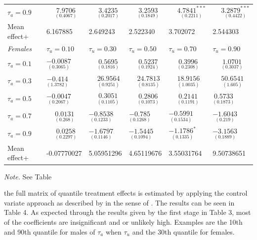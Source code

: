 \documentclass[12pt,a4paper]{article}
\begin{document}
\begin{table}[!htbp]
\begin{threeparttable}
\begin{tabular}{*{6}{l}}
           $\tau_a = 0.9$    & $\phantom{-}\underset{(0.4067)}{7.9706}$ & $\phantom{-}\underset{(0.2017)}{3.4235}$ & $\phantom{-}\underset{(0.1849)}{3.2593}$ & $\phantom{-}\underset{(0.2211)}{4.7841^{***}}$ & $\phantom{-}\underset{(0.4422)}{3.2879^{***}}$ 
\\ 
Mean effect+ &6.167885 & 2.649243 & 2.522340 &  3.702072 &  2.544303
\\ \toprule
        \textit{Females} &  \( \tau_u=0.10\) & \( \tau_u= 0.30\) & \( \tau_u= 0.50\) & \( \tau_u= 0.70\) & \( \tau_u= 0.90\) \\
        \midrule
        \addlinespace
        $\tau_a = 0.1$ & $\underset{(0.3065)}{-0.0087}$ & $\phantom{-}\underset{(0.1816)}{0.5695}$ & $\phantom{-}\underset{(0.1924)}{0.5237}$ & $\phantom{-}\underset{(0.2308)}{0.3996}$ & $\phantom{-}\underset{(0.3037)}{1.0701}$   \\
         $\tau_a = 0.3$   & $\underset{(1.3782)}{-0.414}$ & $\phantom{-}\underset{(0.9251)}{26.9564}$ & $\phantom{-}\underset{(0.8135)}{24.7813}$ & $\phantom{-}\underset{(1.0035)}{18.9156}$ & $\phantom{-}\underset{(1.605)}{50.6541}$ \\
          $\tau_a = 0.5$   & $\underset{(0.2067)}{-0.0047}$ & $\phantom{-}\underset{(0.1105)}{0.3051}$ & $\phantom{-}\underset{(0.1073)}{0.2806}$ & $\phantom{-}\underset{(0.1191)}{0.2141}$ & $\underset{(0.1873)}{0.5733}$   \\
           $\tau_a = 0.7$   &  $\phantom{-}\underset{(0.268)}{0.0131}$ & $\underset{(0.1233)}{-0.8538}$ & $\underset{(0.1268)}{-0.785}$ & $\underset{(0.1534)}{-0.5991}$ & $\underset{(0.219)}{-1.6043}$    \\
           $\tau_a = 0.9$    & $\phantom{-}\underset{(0.2297)}{0.0258}$ & $\underset{(0.1146)}{-1.6797}$ & $\underset{(0.1094)}{-1.5445}$ & $\underset{(0.1335)}{-1.1786^{*}}$ & $\underset{(0.1889)}{-3.1563}$    \\
           Mean effect+ & -0.07770027 &  5.05951296 & 4.65119676 &  3.55031764 & 9.50738651 \\
        \bottomrule
     \end{tabular}
    \begin{tablenotes}[flushleft]
      \small
      \item \textit{Note.} See Table 
    \end{tablenotes}
  \end{threeparttable}
\end{table}

the full matrix of quantile treatment effects is estimated by applying
the control variate approach as described by \textcite{MaKoenk} in the
sense of \textcite{brunello}. The results can be seen in Table 4. As
expected through the results given by the first stage in Table 3, most
of the coefficients are insignificant and or unlikely high. Examples are
the 10th and 90th quantile for males of \(\tau_a\) when \(\tau_u\) and
the 30th quantile for females.
\end{document}
